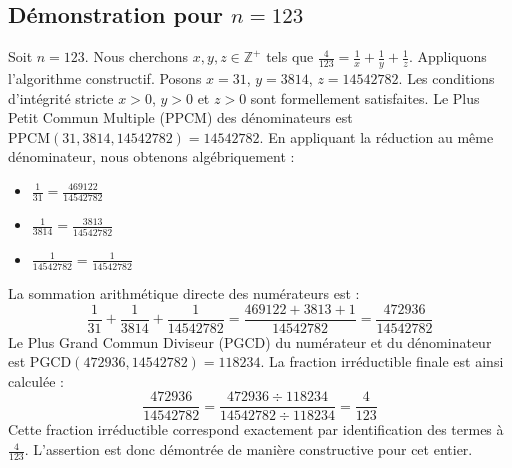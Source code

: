 \documentclass[11pt,a4paper]{article}
\begin{document}
\subsection{Démonstration pour $n = 123$}
Soit $n = 123$. Nous cherchons $x, y, z \in \mathbb{Z}^{+}$ tels que $\frac{4}{123} = \frac{1}{x} + \frac{1}{y} + \frac{1}{z}$.
Appliquons l'algorithme constructif. Posons $x = 31$, $y = 3814$, $z = 14542782$.
Les conditions d'intégrité stricte $x > 0$, $y > 0$ et $z > 0$ sont formellement satisfaites.
Le Plus Petit Commun Multiple (PPCM) des dénominateurs est $\text{PPCM}(31, 3814, 14542782) = 14542782$.
En appliquant la réduction au même dénominateur, nous obtenons algébriquement :
\begin{itemize}
    \item $\frac{1}{31} = \frac{469122}{14542782}$
    \item $\frac{1}{3814} = \frac{3813}{14542782}$
    \item $\frac{1}{14542782} = \frac{1}{14542782}$
\end{itemize}
La sommation arithmétique directe des numérateurs est :
$$ \frac{1}{31} + \frac{1}{3814} + \frac{1}{14542782} = \frac{469122 + 3813 + 1}{14542782} = \frac{472936}{14542782} $$
Le Plus Grand Commun Diviseur (PGCD) du numérateur et du dénominateur est $\text{PGCD}(472936, 14542782) = 118234$.
La fraction irréductible finale est ainsi calculée :
$$ \frac{472936}{14542782} = \frac{472936 \div 118234}{14542782 \div 118234} = \frac{4}{123} $$
Cette fraction irréductible correspond exactement par identification des termes à $\frac{4}{123}$. L'assertion est donc démontrée de manière constructive pour cet entier.
\end{document}
